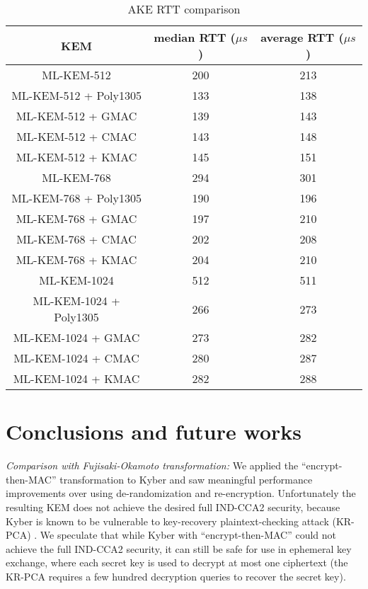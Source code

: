 \documentclass[floatrow,journal=tches,submission]{iacrtrans}
\newcommand{\us}{\mu s}
\begin{document}
\begin{table}[H]
    \caption{AKE RTT comparison}\label{tbl:ake-rtt}
    \begin{tabular}{|c|c|c|}
        \hline
        KEM & median RTT ($\us$) & average RTT ($\us$) \\
        \hline
        ML-KEM-512 & 200 & 213 \\
        \hline
        ML-KEM-512 + Poly1305 & 133 & 138 \\
        \hline
        ML-KEM-512 + GMAC & 139 & 143 \\
        \hline
        ML-KEM-512 + CMAC & 143 & 148 \\
        \hline
        ML-KEM-512 + KMAC & 145 & 151 \\
        \hline 
        ML-KEM-768 & 294 & 301 \\
        \hline
        ML-KEM-768 + Poly1305 & 190 & 196 \\
        \hline
        ML-KEM-768 + GMAC & 197 & 210 \\
        \hline
        ML-KEM-768 + CMAC & 202 & 208 \\
        \hline
        ML-KEM-768 + KMAC & 204 & 210 \\
        \hline
        ML-KEM-1024 & 512 & 511 \\
        \hline
        ML-KEM-1024 + Poly1305 & 266 & 273 \\
        \hline
        ML-KEM-1024 + GMAC & 273 & 282 \\
        \hline
        ML-KEM-1024 + CMAC & 280 & 287 \\
        \hline
        ML-KEM-1024 + KMAC & 282 & 288 \\
        \hline
    \end{tabular}
\end{table}



\section{Conclusions and future works}\label{sec:future-works}
\emph{Comparison with Fujisaki-Okamoto transformation:} We applied the ``encrypt-then-MAC'' transformation to Kyber and saw meaningful performance improvements over using de-randomization and re-encryption. Unfortunately the resulting KEM does not achieve the desired full IND-CCA2 security, because Kyber is known to be vulnerable to key-recovery plaintext-checking attack (KR-PCA) \cite{ravi2019generic}\cite{ueno2022curse}. We speculate that while Kyber with ``encrypt-then-MAC'' could not achieve the full IND-CCA2 security, it can still be safe for use in ephemeral key exchange, where each secret key is used to decrypt at most one ciphertext (the KR-PCA requires a few hundred decryption queries to recover the secret key).
\end{document}

